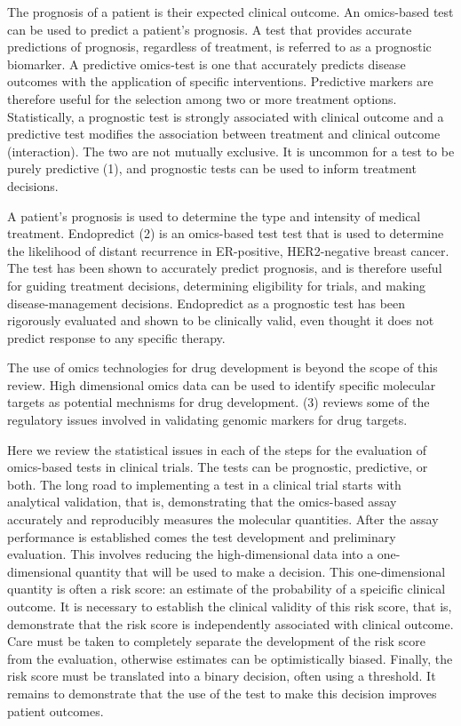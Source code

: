 \documentclass[11pt]{article}
\begin{document}
The prognosis of a patient is their expected clinical outcome. An
omics-based test can be used to predict a patient's prognosis. A test
that provides accurate predictions of prognosis, regardless of
treatment, is referred to as a prognostic biomarker. A predictive
omics-test is one that accurately predicts disease outcomes with the
application of specific interventions. Predictive markers are therefore
useful for the selection among two or more treatment options.
Statistically, a prognostic test is strongly associated with clinical
outcome and a predictive test modifies the association between treatment
and clinical outcome (interaction). The two are not mutually exclusive.
It is uncommon for a test to be purely predictive (1), and prognostic
tests can be used to inform treatment decisions.

A patient's prognosis is used to determine the type and intensity of
medical treatment. Endopredict (2) is an omics-based test test that is
used to determine the likelihood of distant recurrence in ER-positive,
HER2-negative breast cancer. The test has been shown to accurately
predict prognosis, and is therefore useful for guiding treatment
decisions, determining eligibility for trials, and making
disease-management decisions. Endopredict as a prognostic test has been
rigorously evaluated and shown to be clinically valid, even thought it
does not predict response to any specific therapy.

The use of omics technologies for drug development is beyond the scope
of this review. High dimensional omics data can be used to identify
specific molecular targets as potential mechnisms for drug development.
(3) reviews some of the regulatory issues involved in validating genomic
markers for drug targets.

Here we review the statistical issues in each of the steps for the
evaluation of omics-based tests in clinical trials. The tests can be
prognostic, predictive, or both. The long road to implementing a test in
a clinical trial starts with analytical validation, that is,
demonstrating that the omics-based assay accurately and reproducibly
measures the molecular quantities. After the assay performance is
established comes the test development and preliminary evaluation. This
involves reducing the high-dimensional data into a one-dimensional
quantity that will be used to make a decision. This one-dimensional
quantity is often a risk score: an estimate of the probability of a
speicific clinical outcome. It is necessary to establish the clinical
validity of this risk score, that is, demonstrate that the risk score is
independently associated with clinical outcome. Care must be taken to
completely separate the development of the risk score from the
evaluation, otherwise estimates can be optimistically biased. Finally,
the risk score must be translated into a binary decision, often using a
threshold. It remains to demonstrate that the use of the test to make
this decision improves patient outcomes.
\end{document}
